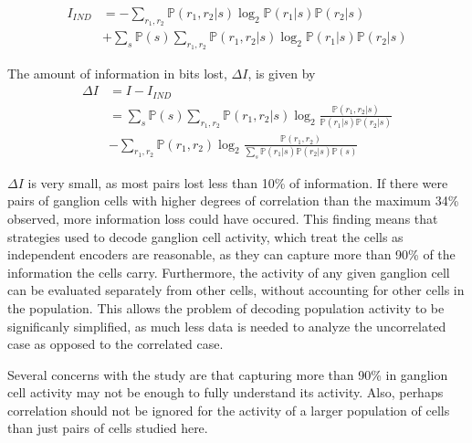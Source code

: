 \documentclass[twoside]{article}
\begin{document}
\begin{multicols}{2}
\begin{align}
	I_{IND} 
		&= -\sum_{r_1,r_2}\mathbb{P}(r_1,r_2|s)\log_2\mathbb{P}(r_1|s)\mathbb{P}(r_2|s) \\
		&+ \sum_s\mathbb{P}(s) \sum_{r_1,r_2}\mathbb{P}(r_1,r_2|s)\log_2\mathbb{P}(r_1|s)\mathbb{P}(r_2|s) 
\end{align}

The amount of information in bits lost, $\Delta I$, is given by 
\begin{align}
	\Delta I 
		&= I - I_{IND} \\
		&= \sum_s\mathbb{P}(s) \sum_{r_1,r_2}\mathbb{P}(r_1,r_2|s) \log_2 \frac{\mathbb{P}(r_1,r_2|s)}{\mathbb{P}(r_1|s)\mathbb{P}(r_2|s)} \\
		&- \sum_{r_1,r_2}\mathbb{P}(r_1,r_2) \log_2 \frac{\mathbb{P}(r_1,r_2)}{\sum_s \mathbb{P}(r_1|s)\mathbb{P}(r_2|s) \mathbb{P}(s)} 
\end{align}

$\Delta I$ is very small, as most pairs lost less than 10\% of information. If there were pairs of ganglion cells with higher degrees of correlation than the maximum 34\% observed, more information loss could have occured. This finding means that strategies used to decode ganglion cell activity, which treat the cells as independent encoders are reasonable, as they can capture more than 90\% of the information the cells carry. Furthermore, the activity of any given ganglion cell can be evaluated separately from other cells, without accounting for other cells in the population. This allows the problem of decoding population activity to be significanly simplified, as much less data is needed to analyze the uncorrelated case as opposed to the correlated case. 

Several concerns with the study are that capturing more than 90\% in ganglion cell activity may not be enough to fully understand its activity. Also, perhaps correlation should not be ignored for the activity of a larger population of cells than just pairs of cells studied here. 









\end{multicols}
\end{document}
